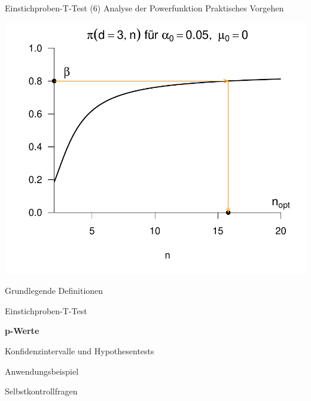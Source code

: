 \documentclass[
  8pt,
  ignorenonframetext,
]{beamer}
\begin{document}
\begin{frame}{Einstichproben-T-Test \textbar{} (6) Analyse der
Powerfunktion}
\protect\hypertarget{einstichproben-t-test-6-analyse-der-powerfunktion-5}{}
Praktisches Vorgehen \vspace{5mm}

\begin{center}\includegraphics[width=0.6\linewidth]{12_Abbildungen/wtfi_12_t_test_ungerichtet_stichprobengröße} \end{center}
\end{frame}

\begin{frame}{}
\protect\hypertarget{section-9}{}
\large
\vfill

Grundlegende Definitionen

Einstichproben-T-Test

\textbf{p-Werte}

Konfidenzintervalle und Hypothesentests

Anwendungsbeispiel

Selbstkontrollfragen \vfill
\end{frame}
\end{document}
